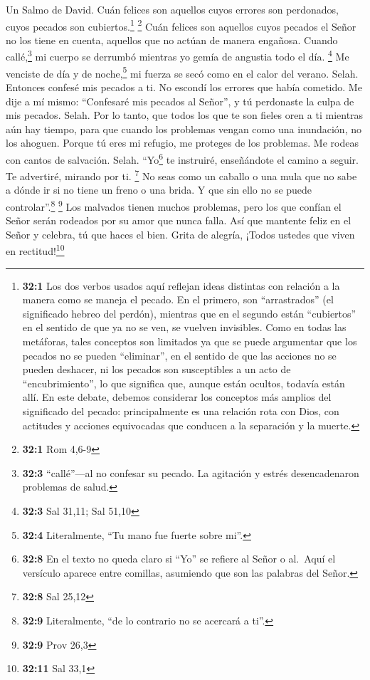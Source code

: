 Un Salmo de David.  Cuán felices son aquellos cuyos
errores son perdonados, cuyos pecados son cubiertos.\footnote{\textbf{32:1}
  Los dos verbos usados aquí reflejan ideas distintas con relación a la
  manera como se maneja el pecado. En el primero, son ``arrastrados''
  (el significado hebreo del perdón), mientras que en el segundo están
  ``cubiertos'' en el sentido de que ya no se ven, se vuelven
  invisibles. Como en todas las metáforas, tales conceptos son limitados
  ya que se puede argumentar que los pecados no se pueden ``eliminar'',
  en el sentido de que las acciones no se pueden deshacer, ni los
  pecados son susceptibles a un acto de ``encubrimiento'', lo que
  significa que, aunque están ocultos, todavía están allí. En este
  debate, debemos considerar los conceptos más amplios del significado
  del pecado: principalmente es una relación rota con Dios, con
  actitudes y acciones equivocadas que conducen a la separación y la
  muerte.} \footnote{\textbf{32:1} Rom 4,6-9}  Cuán
felices son aquellos cuyos pecados el Señor no los tiene en cuenta,
aquellos que no actúan de manera engañosa.  Cuando
callé,\footnote{\textbf{32:3} ``callé''---al no confesar su pecado. La
  agitación y estrés desencadenaron problemas de salud.} mi cuerpo se
derrumbó mientras yo gemía de angustia todo el día. \footnote{\textbf{32:3}
  Sal 31,11; Sal 51,10}  Me venciste de día y de
noche,\footnote{\textbf{32:4} Literalmente, ``Tu mano fue fuerte sobre
  mi''.} mi fuerza se secó como en el calor del verano. Selah.
 Entonces confesé mis pecados a ti. No escondí los errores
que había cometido. Me dije a mí mismo: ``Confesaré mis pecados al
Señor'', y tú perdonaste la culpa de mis pecados. Selah. 
Por lo tanto, que todos los que te son fieles oren a ti mientras aún hay
tiempo, para que cuando los problemas vengan como una inundación, no los
ahoguen.  Porque tú eres mi refugio, me proteges de los
problemas. Me rodeas con cantos de salvación. Selah. 
``Yo\footnote{\textbf{32:8} En el texto no queda claro si ``Yo'' se
  refiere al Señor o al.~Aquí el versículo aparece entre comillas,
  asumiendo que son las palabras del Señor.} te instruiré, enseñándote
el camino a seguir. Te advertiré, mirando por ti. \footnote{\textbf{32:8}
  Sal 25,12}  No seas como un caballo o una mula que no
sabe a dónde ir si no tiene un freno o una brida. Y que sin ello no se
puede controlar''.\footnote{\textbf{32:9} Literalmente, ``de lo
  contrario no se acercará a ti''.} \footnote{\textbf{32:9} Prov 26,3}
 Los malvados tienen muchos problemas, pero los que
confían el Señor serán rodeados por su amor que nunca falla.
 Así que mantente feliz en el Señor y celebra, tú que
haces el bien. Grita de alegría, ¡Todos ustedes que viven en
rectitud!\footnote{\textbf{32:11} Sal 33,1}

